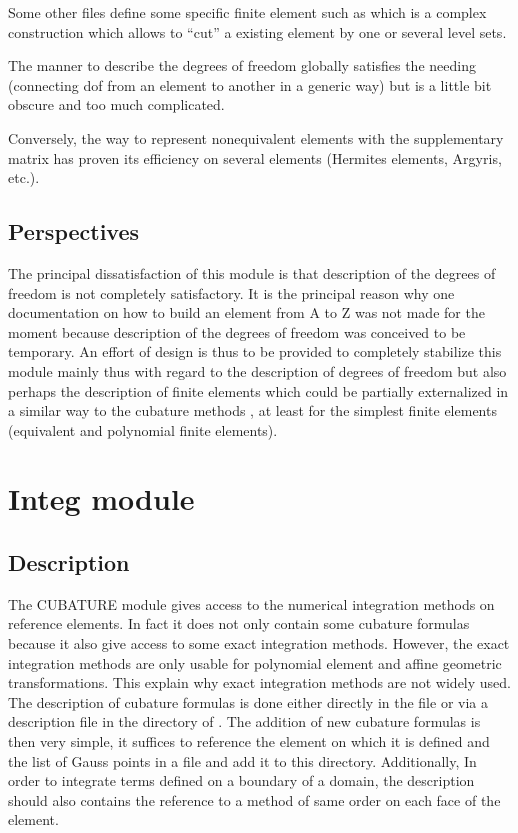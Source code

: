 \documentclass[a4paper,11pt,english]{sphinxmanual}
\begin{document}
Some other files define some specific finite element such as
 which is a complex construction which allows to
“cut” a existing element by one or several level sets.

The manner to describe the degrees of freedom globally satisfies the needing
(connecting dof from an element to another in a generic way) but is a little bit
obscure and too much complicated.

Conversely, the way to represent non\sphinxhyphen{}equivalent elements with the supplementary
matrix  has proven its efficiency on several elements (Hermites elements,
Argyris, etc.).


\subsection{Perspectives}
\label{\detokenize{project/libdesc_fem:perspectives}}
The principal dissatisfaction of this module is that description of the degrees
of freedom is not completely satisfactory. It is the principal reason why one
documentation on how to build an element from A to Z was not made for the moment
because description of the degrees of freedom was conceived to be temporary. An
effort of design is thus to be provided to completely stabilize this module
mainly thus with regard to the description of degrees of freedom but also perhaps
the description of finite elements which could be partially externalized in a
similar way to the cubature methods , at least for the simplest finite elements
(equivalent and polynomial finite elements).


\section{Integ module}
\label{\detokenize{project/libdesc_im:integ-module}}\label{\detokenize{project/libdesc_im:dp-libdesc-im}}\label{\detokenize{project/libdesc_im::doc}}

\subsection{Description}
\label{\detokenize{project/libdesc_im:description}}
The CUBATURE module gives access to the numerical integration methods on
reference elements. In fact it does not only contain some cubature formulas
because it also give access to some exact integration methods. However, the exact
integration methods are only usable for polynomial element and affine geometric
transformations. This explain why exact integration methods are not widely used.
The description of cubature formulas is done either directly in the file
 or via a description file in the directory
 of . The addition of new cubature formulas is then very simple,
it suffices to reference the element on which it is defined and the list of Gauss
points in a file and add it to this directory. Additionally, In order to
integrate terms defined on a boundary of a domain, the description should also
contains the reference to a method of same order on each face of the element.
\end{document}
